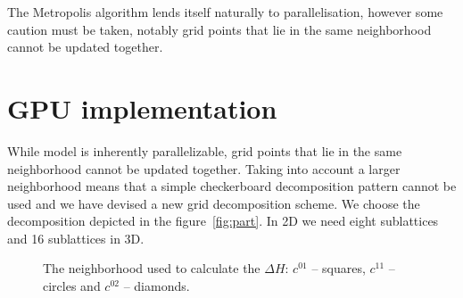 \documentclass[a4paper]{llncs}
\def\bksize{8}
\def\bkcount{4}
\def\lcsize{5}
\begin{document}
The Metropolis algorithm lends itself naturally to parallelisation,
however some caution must be taken, notably grid points that lie in the
same neighborhood cannot be updated together. 

\section{GPU implementation}

While model is inherently parallelizable, grid points that lie in the
same neighborhood cannot be updated together. Taking into account a
larger neighborhood means that a simple checkerboard decomposition
pattern cannot be used and we have devised a new grid decomposition
scheme. We choose the decomposition depicted in the
figure~\ref{fig:part}. In 2D we need eight sublattices and 16
sublattices in 3D.
\begin{figure}
\begin{center}
\end{center}
\caption{\label{fig:nn}The neighborhood used to calculate the $\Delta H$:
$c^{01}$ -- squares, $c^{11}$ -- circles and $c^{02}$ -- diamonds.}
\end{figure}
\end{document}

